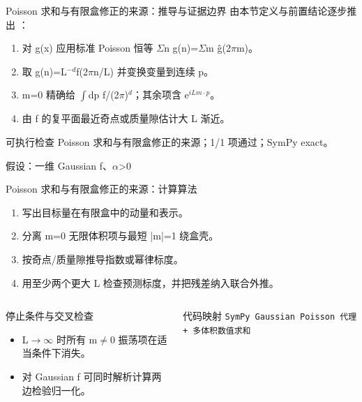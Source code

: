 \begin{frame}[t]{Poisson 求和与有限盒修正的来源：推导与证据边界}
\footnotesize
{}\quad 由本节定义与前置结论逐步推出 ：
\begin{enumerate}
\item 对 g(x) 应用标准 Poisson 恒等 \ensuremath{\Sigma}n g(n)=\ensuremath{\Sigma}m ĝ(2\ensuremath{\pi}m)。
\item 取 g(n)=L\ensuremath{^{-d}}f(2\ensuremath{\pi}n/\allowbreak{}L) 并变换变量到连续 p。
\item m=0 精确给 \ensuremath{\int}dp f/\allowbreak{}(2\ensuremath{\pi})\ensuremath{^{d}}；其余项含 e\ensuremath{^{iLm\cdot p}}。
\item 由 f 的复平面最近奇点或质量隙估计大 L 渐近。
\end{enumerate}\begin{block}{可执行检查}
\quad Poisson 求和与有限盒修正的来源；1/1 项通过；SymPy exact。
\par\scriptsize 假设：一维 Gaussian f、\ensuremath{\alpha}>0
\end{block}
\end{frame}

\begin{frame}[t]{Poisson 求和与有限盒修正的来源：计算算法}
\footnotesize
{}\begin{enumerate}
\item 写出目标量在有限盒中的动量和表示。
\item 分离 m=0 无限体积项与最短 |m|=1 绕盒壳。
\item 按奇点/\allowbreak{}质量隙推导指数或幂律标度。
\item 用至少两个更大 L 检查预测标度，并把残差纳入联合外推。
\end{enumerate}\begin{columns}[T,onlytextwidth]
\begin{block}{停止条件与交叉检查}\scriptsize\begin{itemize}
\item[\CheckMark] L\ensuremath{\rightarrow}\ensuremath{\infty} 时所有 m\ensuremath{\ne}0 振荡项在适当条件下消失。
\item[\CheckMark] 对 Gaussian f 可同时解析计算两边检验归一化。
\end{itemize}\end{block}
\begin{block}{代码映射}
\scriptsize \texttt{SymPy Gaussian Poisson 代理 + 多体积数值求和}
\end{block}\end{columns}\end{frame}

